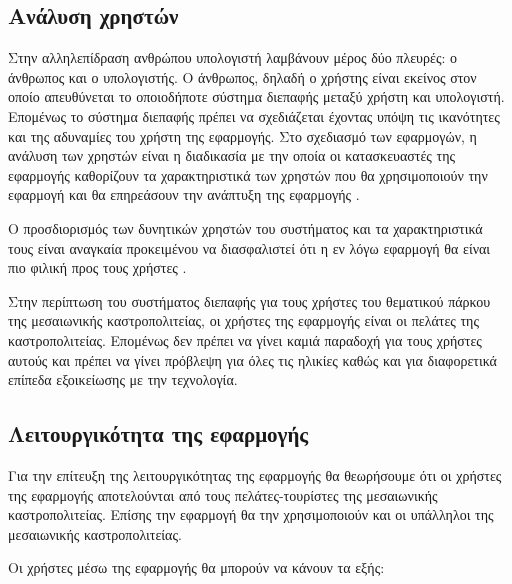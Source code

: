 \documentclass{assignment}
\begin{document}
\subsection{Ανάλυση χρηστών}

Στην αλληλεπίδραση ανθρώπου υπολογιστή λαμβάνουν μέρος δύο πλευρές: ο άνθρωπος και ο υπολογιστής. Ο άνθρωπος, δηλαδή ο χρήστης είναι εκείνος στον οποίο απευθύνεται το οποιοδήποτε σύστημα διεπαφής μεταξύ χρήστη και υπολογιστή. Επομένως το σύστημα διεπαφής πρέπει να σχεδιάζεται έχοντας υπόψη τις ικανότητες και της αδυναμίες του χρήστη της εφαρμογής. Στο σχεδιασμό των εφαρμογών, η ανάλυση των χρηστών είναι η διαδικασία με την οποία οι κατασκευαστές της εφαρμογής καθορίζουν τα χαρακτηριστικά των χρηστών που θα χρησιμοποιούν την εφαρμογή και θα επηρεάσουν την ανάπτυξη της εφαρμογής \cite{wiki:user_analysis,class_notes}.

Ο προσδιορισμός των δυνητικών χρηστών του συστήματος και τα χαρακτηριστικά τους είναι αναγκαία προκειμένου να διασφαλιστεί ότι η εν λόγω εφαρμογή θα είναι πιο φιλική προς τους χρήστες \cite{wiki:user_analysis}.

Στην περίπτωση του συστήματος διεπαφής για τους χρήστες του θεματικού πάρκου της μεσαιωνικής καστροπολιτείας, οι χρήστες της εφαρμογής είναι οι πελάτες της καστροπολιτείας. Επομένως δεν πρέπει να γίνει καμιά παραδοχή για τους χρήστες αυτούς και πρέπει να γίνει πρόβλεψη για όλες τις ηλικίες καθώς και για διαφορετικά επίπεδα εξοικείωσης με την τεχνολογία. 

\subsection{Λειτουργικότητα της εφαρμογής}

Για την επίτευξη της λειτουργικότητας της εφαρμογής θα θεωρήσουμε ότι οι χρήστες της εφαρμογής αποτελούνται από τους πελάτες-τουρίστες της μεσαιωνικής καστροπολιτείας. Επίσης την εφαρμογή θα την χρησιμοποιούν και οι υπάλληλοι της μεσαιωνικής καστροπολιτείας.


Οι χρήστες μέσω της εφαρμογής θα μπορούν να κάνουν τα εξής:
\end{document}
